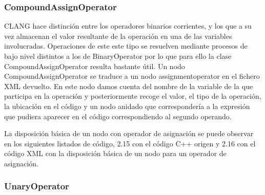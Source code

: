 


\subsubsection*{CompoundAssignOperator}

CLANG hace distinci\'on entre los operadores binarios corrientes, y los que a su vez almacenan el valor resultante de la operaci\'on en una de las variables involucradas. Operaciones de este este tipo se resuelven mediante procesos de bajo nivel distintos a los de BinaryOperator por lo que para ello la clase CompoundAssignOperator resulta bastante \'util. Un nodo CompoundAssignOperator se traduce a un nodo assignmentoperator en el fichero XML devuelto. En este nodo damos cuenta del nombre de la variable de la que participa en la operaci\'on y posteriormente recoge el valor, el tipo de la operaci\'on, la ubicaci\'on en el c\'odigo y un nodo anidado que corresponder\'ia a la expresi\'on que pudiera aparecer en el c\'odigo correspondiendo al segundo operando.

La disposici\'on b\'asica de un nodo con operador de asignaci\'on se puede observar en los siguientes listados de c\'odigo, 2.15 con el c\'odigo C++ origen y 2.16 con el c\'odigo XML con la disposici\'on b\'asica de un nodo para un operador de asignaci\'on.




\subsubsection*{UnaryOperator}

